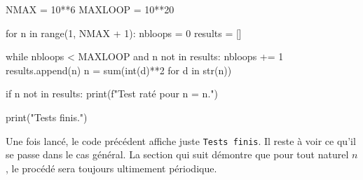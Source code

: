 \begin{rawcode}
NMAX    = 10**6
MAXLOOP = 10**20

for n in range(1, NMAX + 1):
    nbloops = 0
    results = []

    while nbloops < MAXLOOP and n not in results:
        nbloops += 1
        results.append(n)
        n = sum(int(d)**2 for d in str(n))

    if n not in results:
        print(f"Test raté pour n = {n}.")

print("Tests finis.")
\end{rawcode}

\medskip

Une fois lancé, le code précédent affiche juste \verb+Tests finis+.
Il reste à voir ce qu'il se passe dans le cas général. La section qui suit démontre que pour tout naturel $n$, le procédé sera toujours ultimement périodique.
